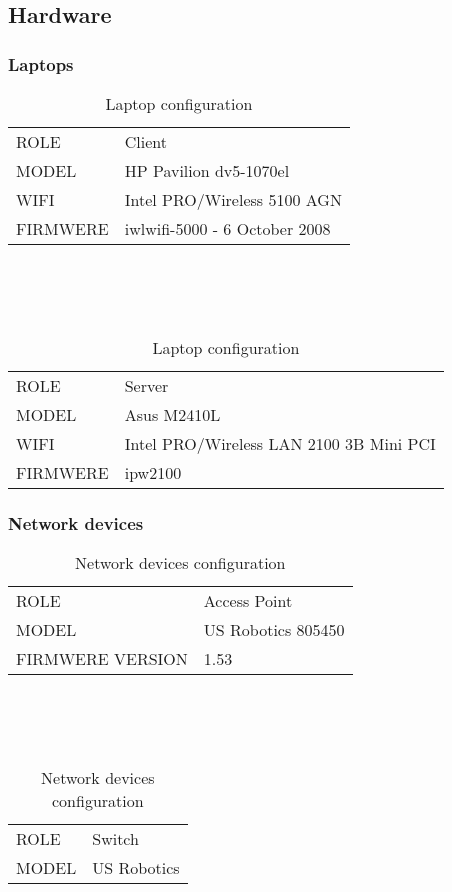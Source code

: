 \subsection{Hardware} \label{setup:hardware}

\subsubsection{Laptops}
	\begin{table}[h]
		
		\begin{tabularx}{15cm}{ | X X | }
			\hline
				ROLE & Client\\
				MODEL & HP Pavilion dv5-1070el\\
				WIFI & Intel PRO/Wireless 5100 AGN\\
				FIRMWERE & iwlwifi-5000 - 6 October 2008\\
			\hline
		\end{tabularx}
		\\\\\\
		\begin{tabularx}{15cm}{ | X X | }
			\hline
				ROLE & Server\\
				MODEL & Asus M2410L\\
				WIFI & Intel PRO/Wireless LAN 2100 3B Mini PCI\\
				FIRMWERE & ipw2100\\
			\hline
		\end{tabularx}
		
		\caption{Laptop configuration}
		\label{table1}
	\end{table}

\subsubsection{Network devices}
	\begin{table}[h]
		
		\begin{tabularx}{15cm}{ | X X | }
			\hline
				ROLE & Access Point\\
				MODEL & US Robotics 805450\\
				FIRMWERE VERSION & 1.53\\
			\hline
		\end{tabularx}
		\\\\\\
		\begin{tabularx}{15cm}{ | X X | }
			\hline
				ROLE & Switch\\
				MODEL & US Robotics\\
			\hline
		\end{tabularx}
		
		\caption{Network devices configuration}
		\label{table2}
	\end{table}